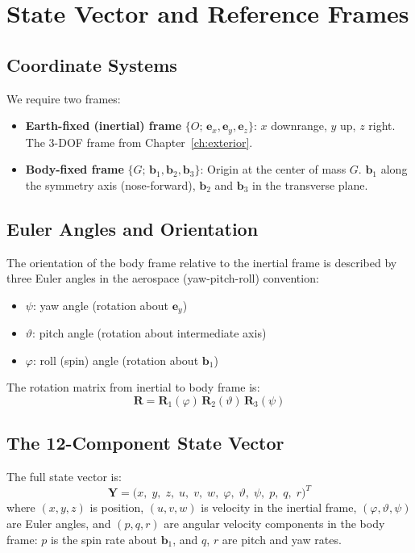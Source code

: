 \documentclass[11pt,twoside,openright]{report}
\begin{document}
\section{State Vector and Reference Frames}

\subsection{Coordinate Systems}

We require two frames:

\begin{itemize}[nosep]
  \item \textbf{Earth-fixed (inertial) frame} $\{O;\,\bm{e}_x, \bm{e}_y, \bm{e}_z\}$: $x$ downrange, $y$ up, $z$ right. The 3-DOF frame from Chapter~\ref{ch:exterior}.
  \item \textbf{Body-fixed frame} $\{G;\,\bm{b}_1, \bm{b}_2, \bm{b}_3\}$: Origin at the center of mass $G$. $\bm{b}_1$ along the symmetry axis (nose-forward), $\bm{b}_2$ and $\bm{b}_3$ in the transverse plane.
\end{itemize}

\subsection{Euler Angles and Orientation}

The orientation of the body frame relative to the inertial frame is described by three Euler angles in the aerospace (yaw-pitch-roll) convention:

\begin{itemize}[nosep]
  \item $\psi$: yaw angle (rotation about $\bm{e}_y$)
  \item $\vartheta$: pitch angle (rotation about intermediate axis)
  \item $\varphi$: roll (spin) angle (rotation about $\bm{b}_1$)
\end{itemize}

The rotation matrix from inertial to body frame is:
\begin{equation}
  \bm{R} = \bm{R}_1(\varphi)\,\bm{R}_2(\vartheta)\,\bm{R}_3(\psi)
  \label{eq:rotation_matrix}
\end{equation}

\subsection{The 12-Component State Vector}

The full state vector is:
\begin{equation}
  \bm{Y} = \bigl(x,\; y,\; z,\; u,\; v,\; w,\; \varphi,\; \vartheta,\; \psi,\; p,\; q,\; r\bigr)^T
  \label{eq:6dof_state}
\end{equation}
where $(x,y,z)$ is position, $(u,v,w)$ is velocity in the inertial frame, $(\varphi, \vartheta, \psi)$ are Euler angles, and $(p, q, r)$ are angular velocity components in the body frame: $p$ is the spin rate about $\bm{b}_1$, and $q$, $r$ are pitch and yaw rates.
\end{document}
